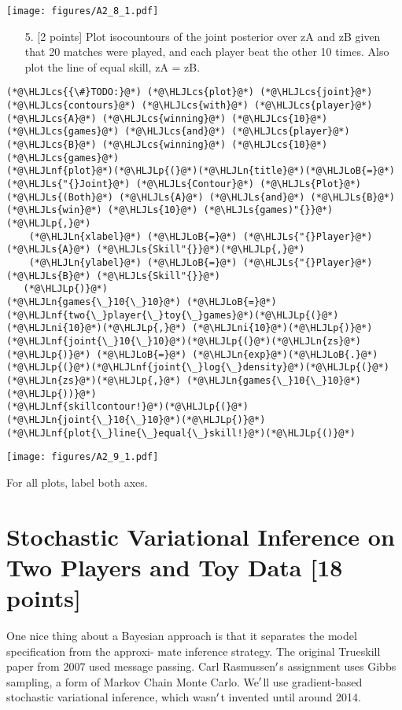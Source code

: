 \documentclass[12pt,a4paper]{article}
\newcommand{\HLJLn}[1]{#1}
\newcommand{\HLJLnf}[1]{\textcolor[RGB]{66,102,213}{#1}}
\newcommand{\HLJLs}[1]{\textcolor[RGB]{201,61,57}{#1}}
\newcommand{\HLJLni}[1]{\textcolor[RGB]{59,151,46}{#1}}
\newcommand{\HLJLoB}[1]{\textcolor[RGB]{102,102,102}{\textbf{#1}}}
\newcommand{\HLJLp}[1]{#1}
\newcommand{\HLJLcs}[1]{\textcolor[RGB]{153,153,119}{\textit{#1}}}
\begin{document}
\texttt{[image: figures/A2\_8\_1.pdf]}

\begin{itemize}
\item[5. ] [2 points] Plot isocountours of the joint posterior over zA and zB given that 20 matches were played, and each player beat the other 10 times. Also plot the line of equal skill, zA = zB.

\end{itemize}

\begin{lstlisting}
(*@\HLJLcs{{\#}TODO:}@*) (*@\HLJLcs{plot}@*) (*@\HLJLcs{joint}@*) (*@\HLJLcs{contours}@*) (*@\HLJLcs{with}@*) (*@\HLJLcs{player}@*) (*@\HLJLcs{A}@*) (*@\HLJLcs{winning}@*) (*@\HLJLcs{10}@*) (*@\HLJLcs{games}@*) (*@\HLJLcs{and}@*) (*@\HLJLcs{player}@*) (*@\HLJLcs{B}@*) (*@\HLJLcs{winning}@*) (*@\HLJLcs{10}@*) (*@\HLJLcs{games}@*)
(*@\HLJLnf{plot}@*)(*@\HLJLp{(}@*)(*@\HLJLn{title}@*)(*@\HLJLoB{=}@*)(*@\HLJLs{"{}Joint}@*) (*@\HLJLs{Contour}@*) (*@\HLJLs{Plot}@*) (*@\HLJLs{(Both}@*) (*@\HLJLs{A}@*) (*@\HLJLs{and}@*) (*@\HLJLs{B}@*) (*@\HLJLs{win}@*) (*@\HLJLs{10}@*) (*@\HLJLs{games)"{}}@*)(*@\HLJLp{,}@*)
    (*@\HLJLn{xlabel}@*) (*@\HLJLoB{=}@*) (*@\HLJLs{"{}Player}@*) (*@\HLJLs{A}@*) (*@\HLJLs{Skill"{}}@*)(*@\HLJLp{,}@*)
    (*@\HLJLn{ylabel}@*) (*@\HLJLoB{=}@*) (*@\HLJLs{"{}Player}@*) (*@\HLJLs{B}@*) (*@\HLJLs{Skill"{}}@*)
   (*@\HLJLp{)}@*)
(*@\HLJLn{games{\_}10{\_}10}@*) (*@\HLJLoB{=}@*) (*@\HLJLnf{two{\_}player{\_}toy{\_}games}@*)(*@\HLJLp{(}@*)(*@\HLJLni{10}@*)(*@\HLJLp{,}@*) (*@\HLJLni{10}@*)(*@\HLJLp{)}@*)
(*@\HLJLnf{joint{\_}10{\_}10}@*)(*@\HLJLp{(}@*)(*@\HLJLn{zs}@*)(*@\HLJLp{)}@*) (*@\HLJLoB{=}@*) (*@\HLJLn{exp}@*)(*@\HLJLoB{.}@*)(*@\HLJLp{(}@*)(*@\HLJLnf{joint{\_}log{\_}density}@*)(*@\HLJLp{(}@*)(*@\HLJLn{zs}@*)(*@\HLJLp{,}@*) (*@\HLJLn{games{\_}10{\_}10}@*)(*@\HLJLp{))}@*)
(*@\HLJLnf{skillcontour!}@*)(*@\HLJLp{(}@*)(*@\HLJLn{joint{\_}10{\_}10}@*)(*@\HLJLp{)}@*)
(*@\HLJLnf{plot{\_}line{\_}equal{\_}skill!}@*)(*@\HLJLp{()}@*)
\end{lstlisting}

\texttt{[image: figures/A2\_9\_1.pdf]}

For all plots, label both axes.

\section{Stochastic Variational Inference on Two Players and Toy Data [18 points]}
One nice thing about a Bayesian approach is that it separates the model specification from the approxi- mate inference strategy. The original Trueskill paper from 2007 used message passing. Carl Rasmussen\ensuremath{\rq}s assignment uses Gibbs sampling, a form of Markov Chain Monte Carlo. We\ensuremath{\rq}ll use gradient-based stochastic variational inference, which wasn\ensuremath{\rq}t invented until around 2014.
\end{document}
